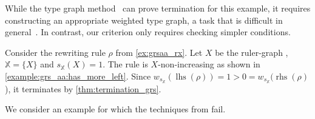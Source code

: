 While the type graph method~\cite{bruggink2014termination, bruggink2015proving,endrullis2024generalized} can prove termination for this example, it requires constructing an appropriate weighted type graph, a task that is difficult in general~\cite[]{bruggink2015proving}. 
In contrast, our criterion only requires checking simpler conditions.
\begin{example}
    \label{ex:termination:grsaa}
    Consider the rewriting rule $\rho$ from \autoref{ex:grsaa_rx}. Let $X$ be the ruler-graph , $\mathbb{X} = \{X\}$ and $s_\mathbb{X}(X) = 1$. The rule is $X$-non-increasing as shown in \autoref{example:grs_aa:has_more_left}. 
    Since \(w_{s_\mathbb{X}}(\operatorname{lhs}(\rho)) = 1 > 0 = w_{s_\mathbb{X}}(\operatorname{rhs}(\rho)\)),
    it terminates by \autoref{thm:termination_grs}.
\end{example}
We consider an example for which the techniques from \cite{bruggink2014termination,bruggink2015proving,endrullis2024generalized,plump2018modular,overbeek2024termination_lmcs} fail.
    
